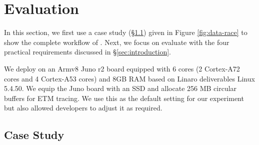 \section{Evaluation} \label{sec:evaluation}


In this section, we first use a case study (\S\ref{subsec:eva-casestudy}) given
in Figure \ref{fig:data-race} to show the complete workflow of \TheName. 
Next, we focus on evaluate \TheName{} with the four practical requirements
discussed in \S\ref{sec:introduction}.

We deploy \TheName on an Armv8 Juno r2 board equipped with 6 cores (2
Cortex-A72 cores and 4 Cortex-A53 cores) and 8GB RAM based on Linaro
deliverables Linux 5.4.50. We equip the Juno board with an SSD and allocate
256 MB circular buffers for ETM tracing. We use this as the default setting for
our experiment but also allowed developers to adjust it as required.

\subsection{Case Study} \label{subsec:eva-casestudy}



